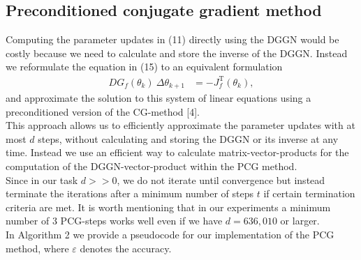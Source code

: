 \documentclass[conference]{IEEEtran}
\begin{document}
	
	\subsection{Preconditioned conjugate gradient method}
	\noindent
	Computing the parameter updates in (11) directly using the DGGN would be costly because we need to calculate and store the inverse of the DGGN. Instead we reformulate the equation in (15) to an equivalent formulation
	\begin{align}
	DG_{f}(\theta_{k})\: \Delta\theta_{k+1} &= -J_{f}^{\mathrm{T}}(\theta_{k}),
	\end{align}
	and approximate the solution to this system of linear equations using a preconditioned version of the CG-method [4]. \\
	This approach allows us to efficiently approximate the parameter updates with at most $d$ steps, without calculating and storing the DGGN or its inverse at any time. Instead we use an efficient way to calculate matrix-vector-products for the computation of the DGGN-vector-product within the PCG method.\\
	Since in our task $d>>0$, we do not iterate until convergence but instead terminate the iterations after a minimum number of steps $t$ if certain termination criteria are met. It is worth mentioning that in our experiments a minimum number of 3 PCG-steps works well even if we have $d=636,010$ or larger. \\
	In Algorithm 2 we provide a pseudocode for our implementation of the PCG method, where $\varepsilon$ denotes the accuracy.
	
\end{document}
